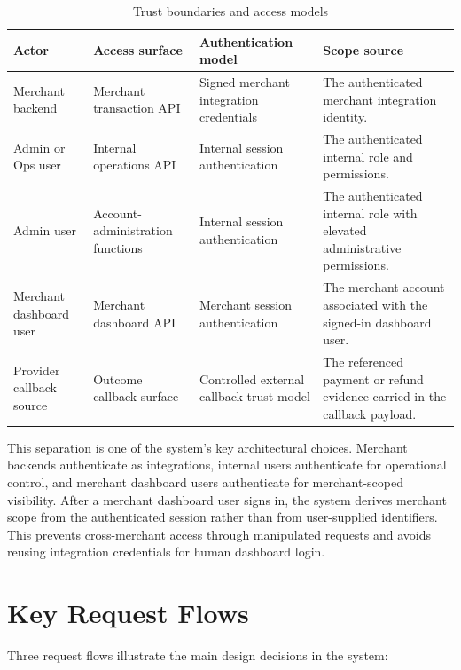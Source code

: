 \begin{table}[!htbp]
\centering
\caption{Trust boundaries and access models}
\begin{tabularx}{\textwidth}{L{0.20\textwidth}L{0.21\textwidth}L{0.24\textwidth}Y}
\toprule
\textbf{Actor} & \textbf{Access surface} & \textbf{Authentication model} & \textbf{Scope source} \\
\midrule
Merchant backend & Merchant transaction API & Signed merchant integration credentials & The authenticated merchant integration identity. \\
\bodyrowrule
Admin or Ops user & Internal operations API & Internal session authentication & The authenticated internal role and permissions. \\
\bodyrowrule
Admin user & Account-administration functions & Internal session authentication & The authenticated internal role with elevated administrative permissions. \\
\bodyrowrule
Merchant dashboard user & Merchant dashboard API & Merchant session authentication & The merchant account associated with the signed-in dashboard user. \\
\bodyrowrule
Provider callback source & Outcome callback surface & Controlled external callback trust model & The referenced payment or refund evidence carried in the callback payload. \\
\bottomrule
\end{tabularx}
\end{table}

This separation is one of the system's key architectural choices. Merchant
backends authenticate as integrations, internal users authenticate for
operational control, and merchant dashboard users authenticate for
merchant-scoped visibility. After a merchant dashboard user signs in, the
system derives merchant scope from the authenticated session rather than from
user-supplied identifiers. This prevents cross-merchant access through
manipulated requests and avoids reusing integration credentials for human
dashboard login.

\section{Key Request Flows}

Three request flows illustrate the main design decisions in the system:

